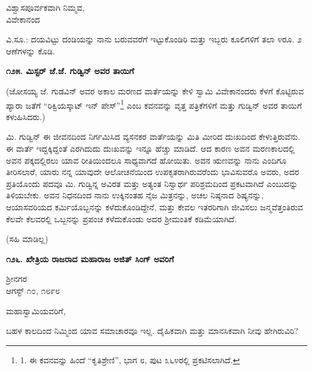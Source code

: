 \begin{flushright}
ವಿಶ್ವಾಸಪೂರ್ವಕವಾಗಿ ನಿಮ್ಮವ,\\ವಿವೇಕಾನಂದ
\end{flushright}

ವಿ.ಸೂ.: ದಯವಿಟ್ಟು ದಂಡಿಯನ್ನು ನಾನು ಬರುವವರೆಗೆ ಇಟ್ಟುಕೊಂಡಿರಿ ಮತ್ತು ಇಬ್ಬರು ಕೂಲಿಗಳಿಗೆ ತಲಾ ೪ರೂ. ೨ ಆಣೆಗಳನ್ನು ಕೊಡಿ.


\begin{center}
\textbf{೧೨೫. ಮಿಸ್ಟರ್ ಜೆ.ಜೆ. ಗುಡ್ವಿನ್ ಅವರ ತಾಯಿಗೆ}
\end{center}

\begin{flushright}
(ಜೋಸಯ್ಯ ಜೆ. ಗುಡವಿನ್ ಅವರ ಅಕಾಲ ಮರಣದ ವಾರ್ತೆಯನ್ನು ಕೇಳಿ ಸ್ವಾಮಿ ವಿವೇಕಾನಂದರು ಕೆಳಗೆ ಕೊಟ್ಟಿರುವ ಪ್ಯಾರಾ ಜತೆಗೆ “ರಿಕ್ವಿಯಸ್ಕಾಟ್ ಇನ್ ಪೇಸ್”\footnote{1. ಈ ಕವನವನ್ನು ಹಿಂದೆ “ಕೃತಿಶ್ರೇಣಿ”, ಭಾಗ ೮, ಪುಟ ೩೬೪ರಲ್ಲಿ ಪ್ರಕಟಿಸಲಾಗಿದೆ.} ಎಂಬ ಕವನವನ್ನು ವೃತ್ತ ಪತ್ರಿಕೆಗಳಿಗೆ ಮತ್ತು ಗುಡ್ವಿನ್ ಅವರ ತಾಯಿಗೆ ಕಳುಹಿಸಿದರು.)
\end{flushright}

ಮಿ. ಗುಡ್ವಿನ್ ಈ ಜೀವನದಿಂದ ನಿರ್ಗಮಿಸಿದ ವ್ಯಸನಕರ ವಾರ್ತೆಯನ್ನು ಮಿತಿ ಮೀರಿದ ದುಃಖದಿಂದ ಕೇಳುತ್ತಿರುವೆನು. ಈ ವಾರ್ತೆ ಇದ್ದಕ್ಕಿದ್ದಂತೆ ಎರಗಿದುದು ದುಃಖವನ್ನು ಇನ್ನೂ ಹೆಚ್ಚು ಮಾಡಿದೆ. ಆದ ಕಾರಣ ಅವನ ಮರಣಕಾಲದಲ್ಲಿ ಅವನ ಪಕ್ಕದಲ್ಲಿರಲು ಯಾವ ರೀತಿಯಿಂದಲೂ ಸಾಧ್ಯವಾಗದೆ ಹೋಯಿತು. ಅವನ ಋಣವನ್ನು ನಾನು ಎಂದಿಗೂ ತೀರಿಸಲಾರೆ, ಯಾರು ನನ್ನ ಯಾವುದೇ ಆಲೋಚನೆಯಿಂದ ಉಪಕೃತರಾಗಿರುವರೆಂದು ಭಾವಿಸುವರೊ ಅವರು, ಅದರ ಪ್ರತಿಯೊಂದು ಪದವೂ ಮಿ. ಗುಡ್ವಿನ್ನ ಅವಿರತ ಮತ್ತು ಅತ್ಯಂತ ನಿಸ್ವಾರ್ಥ ಪರಿಶ್ರಮದಿಂದ ಪ್ರಕಟವಾಗಿದೆ ಎಂಬುದನ್ನು ತಿಳಿಯಬೇಕು. ಅವನ ನಿಧನದಿಂದ ನಾನು ಉಕ್ಕಿನಂತಹ ನೈಜ ಮಿತ್ರನನ್ನು, ಅಚಲ ನಿಷ್ಠನಾದ ಶಿಷ್ಯನನ್ನು, ಆಯಾಸವರಿಯದ ಕರ್ಮಿಯೊಬ್ಬನನ್ನು ಕಳೆದುಕೊಂಡಿದ್ದೇನೆ, ಮತ್ತು ಕೇವಲ ಇತರರಿಗಾಗಿ ಜೀವಿಸಲು ಜನ್ಮವೆತ್ತಂತಿರುವ ಕೆಲವೇ ಕೆಲವರಲ್ಲಿ ಒಬ್ಬನನ್ನು ಪ್ರಪಂಚ ಕಳೆದುಕೊಂಡು ಅದರ ಶ‍್ರೀಮಂತಿಕೆ ಕಡಿಮೆಯಾಗಿದೆ.

\begin{flushright}
(ಸಹಿ ಮಾಡಿಲ್ಲ)
\end{flushright}

\begin{center}
\textbf{೧೨೬. ಖೇತ್ರಿಯ ರಾಜರಾದ ಮಹಾರಾಜ ಅಜಿತ್ ಸಿಂಗ್ ಅವರಿಗೆ}
\end{center}

\begin{flushright}
ಶ‍್ರೀನಗರ\\ಆಗಸ್ಟ್ ೧೦, ೧೮೯೮
\end{flushright}

ಮಹಾಸ್ವಾಮಿಯವರಿಗೆ,

ಬಹಳ ಕಾಲದಿಂದ ನಿಮ್ಮಿಂದ ಯಾವ ಸಮಾಚಾರವೂ ಇಲ್ಲ. ದೈಹಿಕವಾಗಿ ಮತ್ತು ಮಾನಸಿಕವಾಗಿ ನೀವು ಹೇಗಿರುವಿರಿ?

